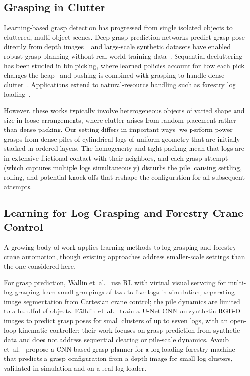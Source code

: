 \documentclass[letterpaper, 10 pt, conference]{ieeeconf}
\begin{document}
\subsection{Grasping in Clutter}
Learning-based grasp detection has progressed from single isolated objects to cluttered, multi-object scenes.                                       
Deep grasp prediction networks predict grasp pose directly from depth images~\cite{morrison2018closing, kumra2017robotic}, and large-scale
synthetic datasets have enabled robust grasp planning without real-world
training data~\cite{mahler2017dexnet}.
Sequential decluttering has been studied in bin picking, where learned
policies account for how each pick changes the
heap~\cite{mahler2017sequential} and pushing is combined with grasping to
handle dense clutter~\cite{zeng2018learning}.
Applications extend to natural-resource handling such as forestry log loading~\cite{wallin2024multilog}.

However, these works typically involve heterogeneous objects of varied shape and size in loose arrangements, where clutter arises from random placement rather than dense packing.
Our setting differs in important ways: we perform power grasps from dense piles of cylindrical logs of uniform geometry that are initially stacked in ordered layers.
The homogeneity and tight packing mean that logs are in extensive frictional contact with their neighbors, and each grasp attempt (which captures multiple logs simultaneously) disturbs the pile, causing settling, rolling, and potential knock-offs that reshape the configuration for all subsequent attempts.

\subsection{Learning for Log Grasping and Forestry Crane Control}
A growing body of work applies learning methods to log grasping and forestry crane automation, though existing approaches address smaller-scale settings than the one considered here.

For grasp prediction, Wallin et~al.~\cite{wallin2024multilog} use RL with virtual visual servoing for multi-log grasping from small groupings of two to five logs in simulation, separating image segmentation from Cartesian crane control; the pile dynamics are limited to a handful of objects.
F{\"a}lldin et~al.~\cite{falldin2025synthesizing} train a U-Net CNN on synthetic RGB-D images to predict grasp poses for small clusters of up to seven logs, with an open-loop kinematic controller; their work focuses on grasp prediction from synthetic data and does not address sequential clearing or pile-scale dynamics.
Ayoub et~al.~\cite{ayoub2023grasp} propose a CNN-based grasp planner for a log-loading forestry machine that predicts a grasp configuration from a depth image for small log clusters, validated in simulation and on a real log loader.
\end{document}
